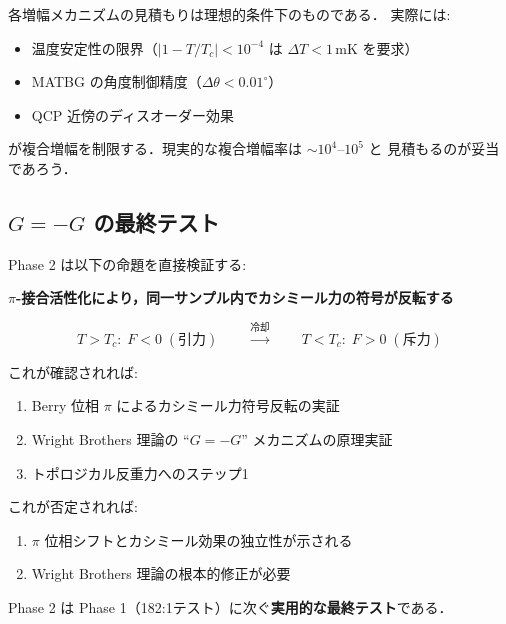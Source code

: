\begin{warningbox}[$10^6$ 増幅の現実性]
各増幅メカニズムの見積もりは理想的条件下のものである．
実際には:
\begin{itemize}
\item 温度安定性の限界（$|1-T/T_c| < 10^{-4}$ は $\Delta T < 1$\,mK を要求）
\item MATBG の角度制御精度（$\Delta\theta < 0.01^\circ$）
\item QCP 近傍のディスオーダー効果
\end{itemize}
が複合増幅を制限する．現実的な複合増幅率は $\sim 10^4$--$10^5$ と
見積もるのが妥当であろう．
\end{warningbox}

\subsection{$G = -G$ の最終テスト}

\begin{keyresult}
Phase 2 は以下の命題を直接検証する:

\begin{center}
\textbf{$\pi$-接合活性化により，同一サンプル内でカシミール力の符号が反転する}
\end{center}

\begin{equation}
T > T_c:\; F < 0\;(\text{引力})
\qquad\xrightarrow{\text{冷却}}\qquad
T < T_c:\; F > 0\;(\text{斥力})
\end{equation}

これが確認されれば:
\begin{enumerate}
\item Berry 位相 $\pi$ によるカシミール力符号反転の実証
\item Wright Brothers 理論の ``$G = -G$'' メカニズムの原理実証
\item トポロジカル反重力へのステップ1
\end{enumerate}

これが否定されれば:
\begin{enumerate}
\item $\pi$ 位相シフトとカシミール効果の独立性が示される
\item Wright Brothers 理論の根本的修正が必要
\end{enumerate}

Phase 2 は Phase 1（182:1テスト）に次ぐ\textbf{実用的な最終テスト}である．
\end{keyresult}


